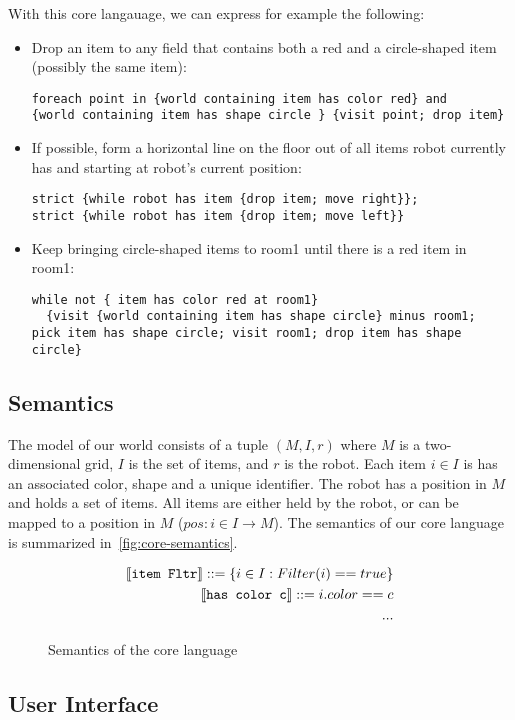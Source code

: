 With this core langauage, we can express for example the following:
\begin{itemize}
	\item Drop an item to any field that contains both a red and a circle-shaped item
    (possibly the same item):
    \begin{lstlisting}
foreach point in {world containing item has color red} and
{world containing item has shape circle } {visit point; drop item}
	   \end{lstlisting}

  \item If possible, form a horizontal line on the floor out of all items robot
    currently has and starting at robot's current position:
    \begin{lstlisting}
strict {while robot has item {drop item; move right}};
strict {while robot has item {drop item; move left}}
    \end{lstlisting}

	\item Keep bringing circle-shaped items to room1 until there is a red item in room1:
    \begin{lstlisting}
while not { item has color red at room1}
  {visit {world containing item has shape circle} minus room1;
pick item has shape circle; visit room1; drop item has shape circle}
    \end{lstlisting}
\end{itemize}


\subsection{Semantics}

The model of our world consists of a tuple $(M, I, r)$ where
$M$ is a two-dimensional grid, $I$ is the set of items, and $r$ is the robot.
Each item $i \in I$ is has an associated color, shape and a unique identifier.
The robot has a position in $M$ and holds a set of items. All items are either held by
the robot, or can be mapped to a position in $M$ ($pos: i \in I \to M$).
The semantics of our core language is summarized in~\autoref{fig:core-semantics}.
\begin{figure}
  \begin{align*}
  \llbracket \texttt{item Fltr}\rrbracket ::= \{i \in I: Filter(i) == true \} \\
  \llbracket \texttt{has color c}\rrbracket ::= i.color == c\\
  ...
  \end{align*}
  \caption{Semantics of the core language}
  \label{fig:core-semantics}
\end{figure}

\subsection{User Interface}
\cite{wangVoxelurn}
